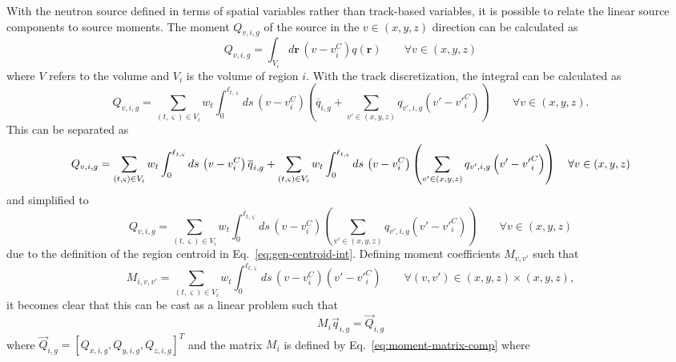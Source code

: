 With the neutron source defined in terms of spatial variables rather than track-based variables, it is possible to relate the linear source components to source moments. The moment $Q_{v,i,g}$ of the source in the $v\in(x,y,z)$ direction can be calculated as
\begin{equation}
Q_{v,i,g} = \int_{V_i} d\mathbf{r} \, \left(v - v^C_i\right) q(\mathbf{r}) \qquad \forall v \in (x,y,z)
\end{equation}
where $V$ refers to the volume and $V_i$ is the volume of region $i$. With the track discretization, the integral can be calculated as
\begin{equation}
Q_{v,i,g}  = \sum_{(t,\varsigma) \in V_i} w_t \int_{0}^{\ell_{t,\varsigma}} ds \, \left(v - v^C_i\right) \left(\overline{q}_{i,g} + \sum_{v' \in (x,y,z)} q_{v',i,g} \left( v' - {v'}^C_i \right)\right) \qquad \forall v \in (x,y,z).
\end{equation}
This can be separated as
\begin{dmath}
Q_{v,i,g} = \sum_{(t,\varsigma) \in V_i} w_t \int_{0}^{\ell_{t,\varsigma}} ds \, \left(v - v^C_i\right) \overline{q}_{i,g} + \\ {\sum_{(t,\varsigma) \in V_i} w_t \int_{0}^{\ell_{t,\varsigma}} ds \, \left(v - v^C_i\right) \left(\sum_{v' \in (x,y,z)} q_{v',i,g} \left( v' - {v'}^C_i \right)\right) \quad \forall v \in (x,y,z)}
\end{dmath}
and simplified to
\begin{equation}
Q_{v,i,g}  = \sum_{(t,\varsigma) \in V_i} w_t \int_{0}^{\ell_{t,\varsigma}} ds \, \left(v - v^C_i\right) \left(\sum_{v' \in (x,y,z)} q_{v',i,g} \left( v' - {v'}^C_i \right)\right) \qquad \forall v \in (x,y,z)
\label{eq:ls-source-moments}
\end{equation}
due to the definition of the region centroid in Eq.~\ref{eq:gen-centroid-int}. Defining moment coefficients $M_{v,v'}$ such that
\begin{equation}
M_{i,v,v'} = \sum_{(t,\varsigma) \in V_i} w_t  \int_{0}^{\ell_{t,\varsigma}} ds \, \left(v - v^C_i\right) \left( v' - {v'}^C_i \right) \qquad \forall (v,v') \in (x,y,z) \times (x,y,z),
\label{eq:moment-matrix-comp}
\end{equation}
it becomes clear that this can be cast as a linear problem such that
\begin{equation}
M_i \vec{q}_{i,g} = \vec{Q}_{i,g}
\label{eq:lin-moment-system}
\end{equation}
where $\vec{Q}_{i,g} = \left[Q_{x,i,g}, Q_{y,i,g}, Q_{z,i,g}\right]^T$ and the matrix $M_i$ is defined by Eq.~\ref{eq:moment-matrix-comp} where
